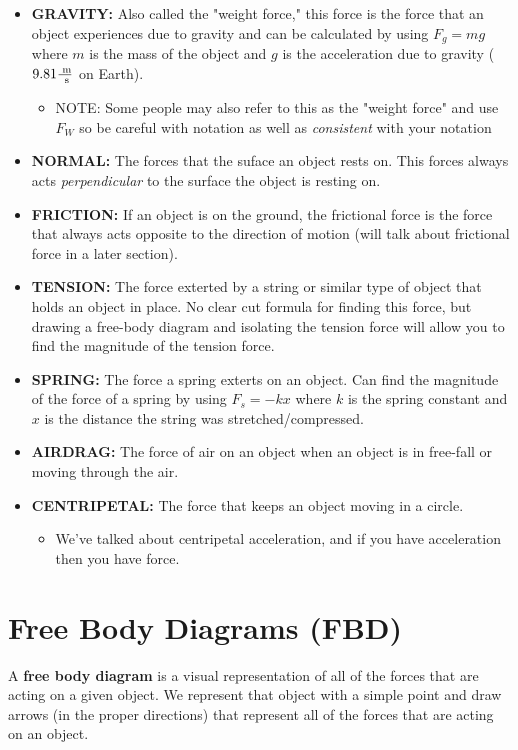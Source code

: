 \begin{itemize}
	\item \textbf{GRAVITY:} Also called the "weight force," this force is the force that an object experiences due to gravity and can be calculated by using $F_g = mg$ where $m$ is the mass of the object and $g$ is the acceleration due to gravity ($9.81\frac{\text{ m}}{\text{ s}}$ on Earth).
	\begin{itemize}
		\item NOTE: Some people may also refer to this as the "weight force" and use $F_W$ so be careful with notation as well as \textit{consistent} with your notation
	\end{itemize}
	\item \textbf{NORMAL:} The forces that the suface an object rests on. This forces always acts \textit{perpendicular} to the surface the object is resting on.
	\item \textbf{FRICTION:} If an object is on the ground, the frictional force is the force that always acts opposite to the direction of motion (will talk about frictional force in a later section).
	\item \textbf{TENSION:} The force exterted by a string or similar type of object that holds an object in place. No clear cut formula for finding this force, but drawing a free-body diagram and isolating the tension force will allow you to find the magnitude of the tension force. 
	\item \textbf{SPRING:} The force a spring exterts on an object. Can find the magnitude of the force of a spring by using $F_s = -kx$ where $k$ is the spring constant and $x$ is the distance the string was stretched/compressed.
	\item \textbf{AIRDRAG:} The force of air on an object when an object is in free-fall or moving through the air.
	\item \textbf{CENTRIPETAL:} The force that keeps an object moving in a circle.
	\begin{itemize}
		\item We've talked about centripetal acceleration, and if you have acceleration then you have force.
	\end{itemize}
\end{itemize}


\section{Free Body Diagrams (FBD)}

A \textbf{free body diagram} is a visual representation of all of the forces that are acting on a given object. We represent that object with a simple point and draw arrows (in the proper directions) that represent all of the forces that are acting on an object.\\

